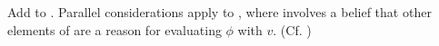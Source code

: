 \begin{note}
  Add to \pool{}.
  Parallel considerations apply to \textcite{Thomson:1965vv}, where \pool{} involves a belief that other elements of \pool{} are a reason for evaluating \(\phi\) with  \(v\).
  (Cf. \citeyear[285]{Thomson:1965vv})
\end{note}




